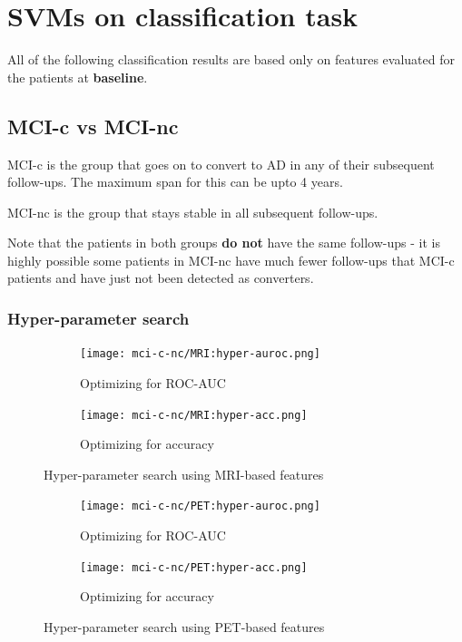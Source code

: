 \documentclass[12pt,a4paper]{article}
\begin{document}
\section{SVMs on classification task}
\label{sec:svm}

All of the following classification results are based only on features
evaluated for the patients at \textbf{baseline}.

\subsection{MCI-c vs MCI-nc}
\label{sec:mci-c-nc}

MCI-c is the group that goes on to convert to AD in any of their
subsequent follow-ups. The maximum span for this can be upto 4 years.

MCI-nc is the group that stays stable in all subsequent
follow-ups. 

Note that the patients in both groups \textbf{do not} have the same
follow-ups - it is highly possible some patients in MCI-nc have much
fewer follow-ups that MCI-c patients and have just not been detected
as converters.

\subsubsection{Hyper-parameter search}
\label{sec:mci-c-nc-hyper}

\begin{figure}[H]
  \centering
  \begin{subfigure}[h]{0.49\textwidth}
    \texttt{[image: mci-c-nc/MRI:hyper-auroc.png]}
    \caption{Optimizing for ROC-AUC}  
  \end{subfigure}
  \begin{subfigure}[h]{0.49\textwidth}
    \texttt{[image: mci-c-nc/MRI:hyper-acc.png]}
    \caption{Optimizing for accuracy}  
  \end{subfigure}
  \caption{Hyper-parameter search using MRI-based features}
\end{figure}

\begin{figure}[H]
  \centering
  \begin{subfigure}[h]{0.49\textwidth}
    \texttt{[image: mci-c-nc/PET:hyper-auroc.png]}
    \caption{Optimizing for ROC-AUC}  
  \end{subfigure}
  \begin{subfigure}[h]{0.49\textwidth}
    \texttt{[image: mci-c-nc/PET:hyper-acc.png]}
    \caption{Optimizing for accuracy}  
  \end{subfigure}
  \caption{Hyper-parameter search using PET-based features}
\end{figure}
\end{document}
